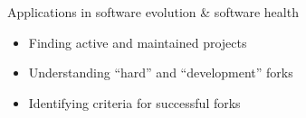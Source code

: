 \documentclass[aspectratio=169,xcolor=table]{beamer}
\begin{document}
\begin{frame}
        \begin{block}{Applications in software evolution \& software health}
            \begin{itemize}
                \item Finding active and maintained projects
                \item Understanding ``hard'' and ``development'' forks
                \item Identifying criteria for successful forks
            \end{itemize}
        \end{block}
    \end{frame}

\end{document}
